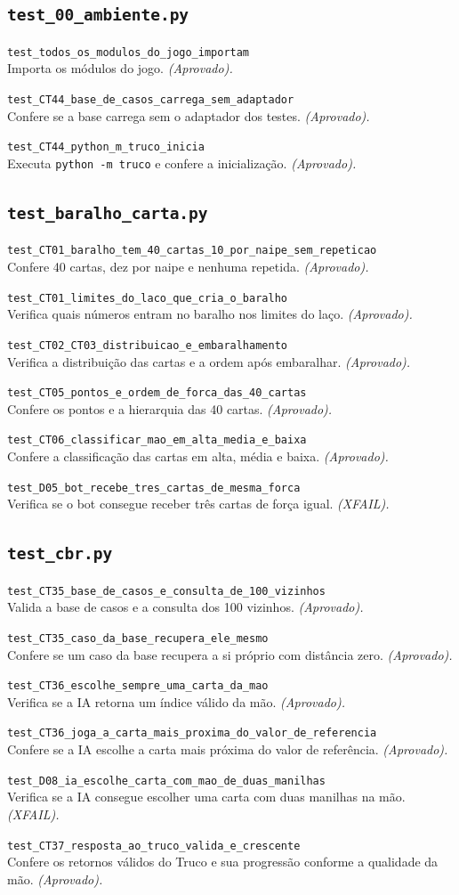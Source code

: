 \documentclass[11pt,a4paper]{article}
\newcommand{\teste}[3]{\par\noindent\begin{minipage}{\textwidth}\texttt{#1}\\#2 \emph{(#3).}\end{minipage}\par\vspace{0.15em}}
\begin{document}
\subsection*{\texttt{\textbf{test\_00\_ambiente.py}}}
\teste{test\_todos\_os\_modulos\_do\_jogo\_importam}{Importa os módulos do jogo.}{Aprovado}
\teste{test\_CT44\_base\_de\_casos\_carrega\_sem\_adaptador}{Confere se a base carrega sem o adaptador dos testes.}{Aprovado}
\teste{test\_CT44\_python\_m\_truco\_inicia}{Executa \texttt{python -m truco} e confere a inicialização.}{Aprovado}
\subsection*{\texttt{\textbf{test\_baralho\_carta.py}}}
\teste{test\_CT01\_baralho\_tem\_40\_cartas\_10\_por\_naipe\_sem\_repeticao}{Confere 40 cartas, dez por naipe e nenhuma repetida.}{Aprovado}
\teste{test\_CT01\_limites\_do\_laco\_que\_cria\_o\_baralho}{Verifica quais números entram no baralho nos limites do laço.}{Aprovado}
\teste{test\_CT02\_CT03\_distribuicao\_e\_embaralhamento}{Verifica a distribuição das cartas e a ordem após embaralhar.}{Aprovado}
\teste{test\_CT05\_pontos\_e\_ordem\_de\_forca\_das\_40\_cartas}{Confere os pontos e a hierarquia das 40 cartas.}{Aprovado}
\teste{test\_CT06\_classificar\_mao\_em\_alta\_media\_e\_baixa}{Confere a classificação das cartas em alta, média e baixa.}{Aprovado}
\teste{test\_D05\_bot\_recebe\_tres\_cartas\_de\_mesma\_forca}{Verifica se o bot consegue receber três cartas de força igual.}{XFAIL}
\subsection*{\texttt{\textbf{test\_cbr.py}}}
\teste{test\_CT35\_base\_de\_casos\_e\_consulta\_de\_100\_vizinhos}{Valida a base de casos e a consulta dos 100 vizinhos.}{Aprovado}
\teste{test\_CT35\_caso\_da\_base\_recupera\_ele\_mesmo}{Confere se um caso da base recupera a si próprio com distância zero.}{Aprovado}
\teste{test\_CT36\_escolhe\_sempre\_uma\_carta\_da\_mao}{Verifica se a IA retorna um índice válido da mão.}{Aprovado}
\teste{test\_CT36\_joga\_a\_carta\_mais\_proxima\_do\_valor\_de\_referencia}{Confere se a IA escolhe a carta mais próxima do valor de referência.}{Aprovado}
\teste{test\_D08\_ia\_escolhe\_carta\_com\_mao\_de\_duas\_manilhas}{Verifica se a IA consegue escolher uma carta com duas manilhas na mão.}{XFAIL}
\teste{test\_CT37\_resposta\_ao\_truco\_valida\_e\_crescente}{Confere os retornos válidos do Truco e sua progressão conforme a qualidade da mão.}{Aprovado}
\end{document}
